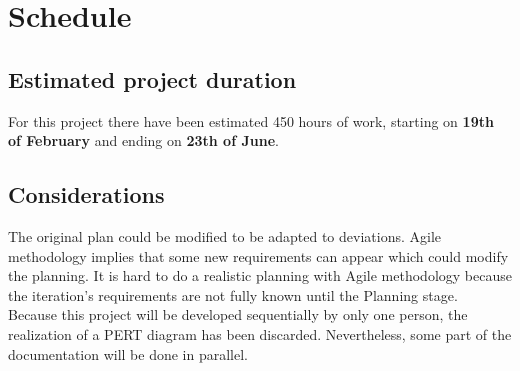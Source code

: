 
\chapter{Schedule} %

\label{Chapter1} %


\section{Estimated project duration}

For this project there have been estimated 450 hours of work, starting on \textbf{19th of February} and ending on \textbf{23th of June}.\\





\section{Considerations}
The original plan could be modified to be adapted to deviations. Agile methodology implies that some new requirements can appear which could modify the planning. It is hard to do a realistic planning with Agile methodology because the iteration's requirements are not fully known until the Planning stage.\\


Because this project will be developed sequentially by only one person, the realization of a PERT diagram has been discarded. Nevertheless, some part of the documentation will be done in parallel.

